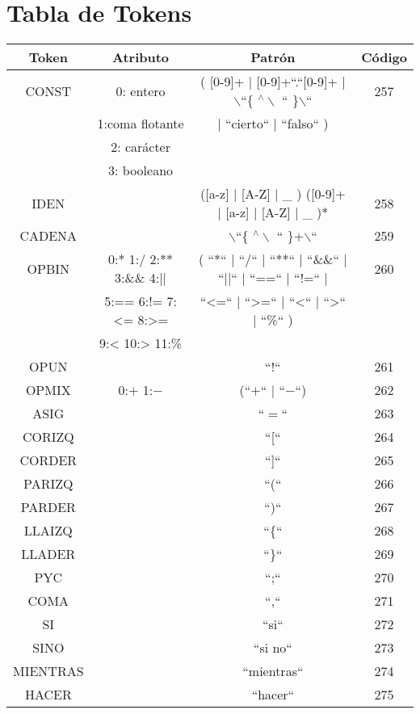 \newpage
\section{Tabla de Tokens}

\begin{table}[H]
\centering
\small
\begin{tabular}{| c | c | c | c |}
  \hline
  Token & Atributo & Patrón & Código \\ \hline
  CONST & 0: entero & ( [0-9]+ | [0-9]+``.``[0-9]+ | $\backslash$``\{  $^\wedge \backslash$ `` \}$\backslash$``  & 257 \\
  & 1:coma flotante & | ``cierto`` | ``falso`` ) &  \\
  & 2: carácter & & \\
  & 3: booleano &  & \\ \hline
  IDEN & & ([a-z] | [A-Z] | \_ ) ([0-9]+ | [a-z] | [A-Z] | \_ )* & 258 \\ \hline
  CADENA & &  $\backslash$``\{  $^\wedge \backslash$ `` \}+$\backslash$``& 259 \\ \hline
  OPBIN & 0:*  1:/  2:**  3:\&\& 4:|| & ( ``*``  |  ``/``  |  ``**``  |  ``\&\&``  |  ``||`` |  ``==`` |  ``$!$=``  |   & 260 \\
  &   5:== 6:!= 7:\textless{}= 8:>=   & ``\textless{}=``  |  ``\textgreater=``  |  ``\textless`` |  ``\textgreater``  |  ``\%``  )& \\
  & 9:< 10:> 11:\% & & \\ \hline
OPUN & & ``$!$`` &  261 \\ \hline
OPMIX & 0:$+$ 1:$-$ & (``$+$`` | ``$-$``) & 262 \\ \hline
ASIG &  & ``$=$`` & 263 \\ \hline
CORIZQ & & ``[`` & 264 \\ \hline
CORDER & & ``]`` & 265\\ \hline
PARIZQ & & ``(`` & 266\\ \hline
PARDER & & ``)`` & 267\\ \hline
LLAIZQ & & ``\{`` & 268\\ \hline
LLADER & & ``\}`` & 269\\ \hline
PYC & & ``;`` & 270\\ \hline
COMA & & ``,`` & 271\\ \hline
SI & & ``si`` & 272\\ \hline
SINO & & ``si no`` & 273\\ \hline
MIENTRAS & & ``mientras`` & 274\\ \hline
HACER& & ``hacer`` & 275\\ \hline

\end{tabular}
\end{table}
